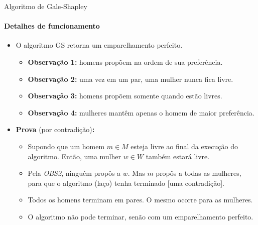 \begin{frame}{Algoritmo de Gale-Shapley}
\framesubtitle{Detalhes de funcionamento}

	\begin{itemize}
		\item {\color{magenta}O algoritmo GS retorna um emparelhamento perfeito.}
		\begin{itemize}
			\item \textbf{Observação 1:} homens propõem na ordem de sua preferência.
			\item \textbf{Observação 2:} uma vez em um par, uma mulher nunca fica livre.
			\item \textbf{Observação 3:} homens propõem somente quando estão livres.
			\item \textbf{Observação 4:} mulheres mantêm apenas o homem de maior preferência.
		\end{itemize}
		
		\medskip
		\item \textbf{Prova} (por contradição)\textbf{:}
		\begin{itemize}
			\item Supondo que um homem $m \in M$ esteja livre ao final da execução do algoritmo. Então, uma mulher $w \in W$ também estará livre.
			\item Pela \textit{OBS2}, ninguém propôs a $w$. Mas $m$ propôs a todas as mulheres, para que o algoritmo (laço) tenha terminado [uma contradição].
			\item Todos os homens terminam em pares. O mesmo ocorre para as mulheres.
			\item O algoritmo não pode terminar, senão com um emparelhamento perfeito.
		\end{itemize}
	\end{itemize}
\end{frame}



